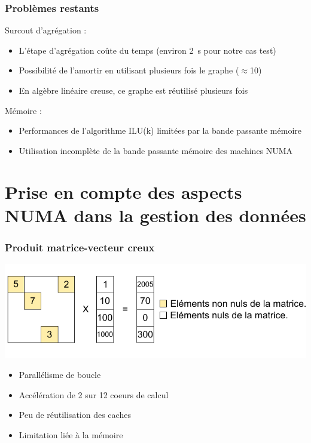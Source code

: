 \documentclass{beamer}
\begin{document}
\begin{frame}
  \frametitle{Problèmes restants}

  Surcout d'agrégation :
  \begin{itemize}
    \item L'étape d'agrégation coûte du temps (environ 2~s pour notre cas test)
    \item Possibilité de l'amortir en utilisant plusieurs fois le graphe ($\approx$10)
    \item En algèbre linéaire creuse, ce graphe est réutilisé plusieurs fois
  \end{itemize}

  Mémoire :
  \begin{itemize}
    \item Performances de l'algorithme ILU(k) limitées par la bande passante mémoire
    \item Utilisation incomplète de la bande passante mémoire des machines NUMA
  \end{itemize}
\end{frame}

\section[Aspects NUMA]{Prise en compte des aspects NUMA dans la gestion des données}
\begin{frame}
  \frametitle{Produit matrice-vecteur creux}
  \centerline{\includegraphics[width=\linewidth]{spmv}}

  \begin{itemize}
    \item Parallélisme de boucle
    \item Accélération de 2 sur 12 coeurs de calcul
    \item Peu de réutilisation des caches
    \item Limitation liée à la mémoire
  \end{itemize}
\end{frame}
\end{document}
